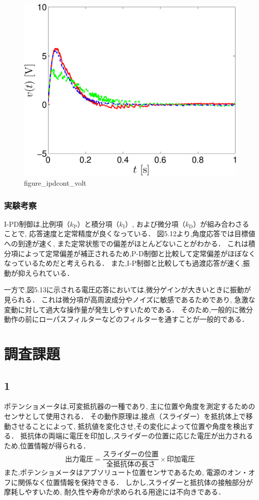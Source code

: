 \begin{figure}[h]
  \centering
  \includegraphics[scale=0.5]{sozai/figure_ipdcont_volt-crop.pdf}
  \caption{figure\_ipdcont\_volt}
\end{figure}

\newpage

\subsubsection{実験考察}
I-PD制御は,比例項（\( k_{\mathrm{P}} \)）と積分項（\( k_{\mathrm{I}} \)）,
および微分項（\( k_{\mathrm{D}} \)）が組み合わさることで,
応答速度と定常精度が良くなっている．
図5.12より,角度応答では目標値への到達が速く,
また定常状態での偏差がほとんどないことがわかる．
これは積分項によって定常偏差が補正されるため,P-D制御と比較して定常偏差がほぼなくなっているためだと考えられる．
また,I-P制御と比較しても過渡応答が速く,振動が抑えられている．

一方で,図5.13に示される電圧応答においては,微分ゲインが大きいときに振動が見られる．
これは微分項が高周波成分やノイズに敏感であるためであり,
急激な変動に対して過大な操作量が発生しやすいためである．
そのため,一般的に微分動作の前にローパスフィルターなどのフィルターを通すことが一般的である．


\section{調査課題}

\subsection*{1}
ポテンショメータは,可変抵抗器の一種であり,
主に位置や角度を測定するためのセンサとして使用される．
その動作原理は,接点（スライダー）を抵抗体上で移動させることによって,
抵抗値を変化させ,その変化によって位置や角度を検出する．
抵抗体の両端に電圧を印加し,スライダーの位置に応じた電圧が出力されるため,位置情報が得られる．
\[
  \text{出力電圧} = \frac{\text{スライダーの位置}}{\text{全抵抗体の長さ}} \times \text{印加電圧}
\]
また,ポテンショメータはアブソリュート位置センサであるため,
電源のオン・オフに関係なく位置情報を保持できる．
しかし,スライダーと抵抗体の接触部分が摩耗しやすいため,
耐久性や寿命が求められる用途には不向きである．


